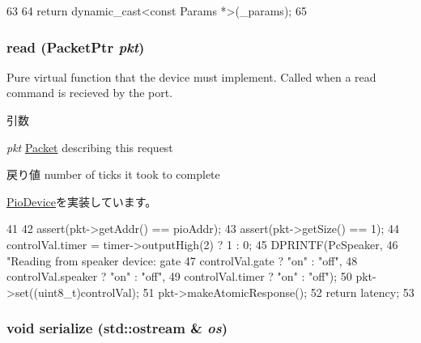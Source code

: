 \begin{DoxyCode}
63     {
64         return dynamic_cast<const Params *>(_params);
65     }
\end{DoxyCode}
\hypertarget{classX86ISA_1_1Speaker_a613ec7d5e1ec64f8d21fec78ae8e568e}{
\subsubsection[{read}]{ read ({\bf PacketPtr} {\em pkt})}}
\label{classX86ISA_1_1Speaker_a613ec7d5e1ec64f8d21fec78ae8e568e}
Pure virtual function that the device must implement. Called when a read command is recieved by the port. 
\begin{DoxyParams}{引数}
\item[{\em pkt}]\hyperlink{classPacket}{Packet} describing this request \end{DoxyParams}
\begin{DoxyReturn}{戻り値}
number of ticks it took to complete 
\end{DoxyReturn}


\hyperlink{classPioDevice_a842312590432036092c422c87a442358}{PioDevice}を実装しています。


\begin{DoxyCode}
41 {
42     assert(pkt->getAddr() == pioAddr);
43     assert(pkt->getSize() == 1);
44     controlVal.timer = timer->outputHigh(2) ? 1 : 0;
45     DPRINTF(PcSpeaker,
46             "Reading from speaker device: gate %
47             controlVal.gate ? "on" : "off",
48             controlVal.speaker ? "on" : "off",
49             controlVal.timer ? "on" : "off");
50     pkt->set((uint8_t)controlVal);
51     pkt->makeAtomicResponse();
52     return latency;
53 }
\end{DoxyCode}
\hypertarget{classX86ISA_1_1Speaker_a53e036786d17361be4c7320d39c99b84}{
\subsubsection[{serialize}]{\setlength{\rightskip}{0pt plus 5cm}void serialize (std::ostream \& {\em os})}}
\label{classX86ISA_1_1Speaker_a53e036786d17361be4c7320d39c99b84}


